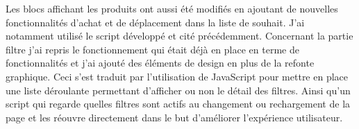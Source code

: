 \documentclass[a4paper,11pt,twoside]{report}
\begin{document}
	Les blocs affichant les produits ont aussi été modifiés en ajoutant de nouvelles fonctionnalités d'achat et de déplacement dans la liste de souhait. J'ai notamment utilisé le script développé et cité précédemment. 
	Concernant la partie filtre j'ai repris le fonctionnement qui était déjà en place en terme de fonctionnalités et j'ai ajouté des éléments de design en plus de la refonte graphique. Ceci s'est traduit par l'utilisation de JavaScript pour mettre en place une liste déroulante permettant d'afficher ou non le détail des filtres. Ainsi qu'un script qui regarde quelles filtres sont actifs au changement ou rechargement de la page et les réouvre directement dans le but d'améliorer l'expérience utilisateur. 
	\label{script_accordion_active}
	
\end{document}
